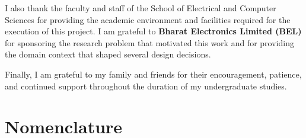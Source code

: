 \documentclass[12pt, a4paper]{report}
\begin{document}
I also thank the faculty and staff of the School of Electrical and Computer
Sciences for providing the academic environment and facilities required for
the execution of this project. I am grateful to \textbf{Bharat Electronics
Limited (BEL)} for sponsoring the research problem that motivated this work
and for providing the domain context that shaped several design decisions.

Finally, I am grateful to my family and friends for their encouragement,
patience, and continued support throughout the duration of my undergraduate
studies.

\vfill
\clearpage

\tableofcontents
\cleardoublepage

\listoffigures
{}
\cleardoublepage

\listoftables
{}
\cleardoublepage

\chapter*{Nomenclature}
\end{document}
